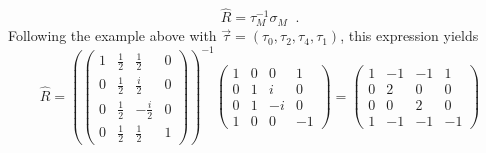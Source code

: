 $$
\hat{R} = \tau_M^{-1}\sigma_M\;\;.
$$
Following the example above with $\vec{\tau} = (\tau_0,\tau_2,\tau_4,\tau_1)$, this expression yields
$$
\hat{R} = \left(\begin{pmatrix}
1 & \frac{1}{2} & \frac{1}{2} & 0 \\
 0 & \frac{1}{2} & \frac{i}{2} & 0 \\
 0 & \frac{1}{2} & -\frac{i}{2} & 0 \\
 0 & \frac{1}{2} & \frac{1}{2} & 1
\end{pmatrix}\right)^{-1}\begin{pmatrix}
 1 & 0 & 0 & 1 \\
 0 & 1 & i & 0 \\
 0 & 1 & -i & 0 \\
 1 & 0 & 0 & -1
\end{pmatrix} = \begin{pmatrix}
 1 & -1 & -1 & 1 \\
 0 & 2 & 0 & 0 \\
 0 & 0 & 2 & 0 \\
 1 & -1 & -1 & -1
\end{pmatrix}
$$


